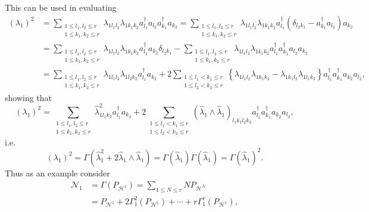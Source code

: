 \documentclass[aps,preprint]{revtex4}%
\begin{document}
This can be used in evaluating
\begin{align*}
\left(  \lambda_{1}\right)  ^{2}  &  =\sum_{\substack{1\leq l_{1},l_{2}\leq
r\\1\leq k_{1},k_{2}\leq r}}\lambda_{1l_{1}l_{2}}\lambda_{1k_{1}k_{2}}%
a_{l_{1}}^{\dagger}a_{l_{2}}a_{k_{1}}^{\dagger}a_{k_{2}}=\sum_{\substack{1\leq
l_{1},l_{2}\leq r\\1\leq k_{1},k_{2}\leq r}}\lambda_{1l_{1}l_{2}}%
\lambda_{1k_{1}k_{2}}a_{l_{1}}^{\dagger}\left(  \delta_{l_{2}k_{1}}-a_{k_{1}%
}^{\dagger}a_{l_{2}}\right)  a_{k_{2}}\\
&  =\sum_{\substack{1\leq l_{1},l_{2}\leq r\\1\leq k_{1},k_{2}\leq r}%
}\lambda_{1l_{1}l_{2}}\lambda_{1k_{1}k_{2}}a_{l_{1}}^{\dagger}a_{k_{2}}%
\delta_{l_{2}k_{1}}-\sum_{\substack{1\leq l_{1},l_{2}\leq r\\1\leq k_{1}%
,k_{2}\leq r}}\lambda_{1l_{1}l_{2}}\lambda_{1k_{1}k_{2}}a_{l_{1}}^{\dagger
}a_{k_{1}}^{\dagger}a_{l_{2}}a_{k_{2}}\\
&  =\sum_{\substack{1\leq l_{1},l_{2}\leq r\\1\leq k_{1},k_{2}\leq r}%
}\lambda_{1l_{1}l_{2}}\lambda_{1l_{2}k_{2}}a_{l_{1}}^{\dagger}a_{k_{2}}%
+2\sum_{\substack{1\leq l_{1}<k_{1}\leq r\\1\leq l_{2}<k_{2}\leq r}}\left\{
\lambda_{1l_{1}l_{2}}\lambda_{1k_{1}k_{2}}-\lambda_{1k_{1}l_{2}}%
\lambda_{1l_{1}k_{2}}\right\}  a_{l_{1}}^{\dagger}a_{k_{1}}^{\dagger}a_{k_{2}%
}a_{l_{2}},
\end{align*}
showing that
\[
\left(  \lambda_{1}\right)  ^{2}=\sum_{\substack{1\leq l_{1},l_{2}\leq
r\\1\leq k_{1},k_{2}\leq r}}\hat{\lambda}_{1l_{1}k_{2}}^{2}a_{l_{1}}^{\dagger
}a_{k_{2}}+2\sum_{\substack{1\leq l_{1}<k_{1}\leq r\\1\leq l_{2}<k_{2}\leq
r}}\left(  \hat{\lambda}_{1}\wedge\hat{\lambda}_{1}\right)  _{l_{1}k_{1}%
l_{2}k_{2}}a_{l_{1}}^{\dagger}a_{k_{1}}^{\dagger}a_{k_{2}}a_{l_{2}},
\]
i.e.%
\[
\left(  \lambda_{1}\right)  ^{2}=\Gamma\left(  \hat{\lambda}_{1}^{2}%
+2\hat{\lambda}_{1}\wedge\hat{\lambda}_{1}\right)  =\Gamma\left(  \hat
{\lambda}_{1}\right)  \Gamma\left(  \hat{\lambda}_{1}\right)  =\Gamma\left(
\hat{\lambda}_{1}\right)  ^{2}.
\]
Thus as an example consider
\begin{align*}
\mathcal{N}_{1}  &  =\Gamma\left(  P_{\mathcal{H}^{1}}\right)  =\sum_{1\leq
N\leq r}NP_{\mathcal{H}^{N}}\\
&  =P_{\mathcal{H}^{1}}+2\Gamma_{1}^{2}\left(  P_{\mathcal{H}^{1}}\right)
+\cdots+r\Gamma_{1}^{r}\left(  P_{\mathcal{H}^{1}}\right)  ,
\end{align*}
\end{document}
